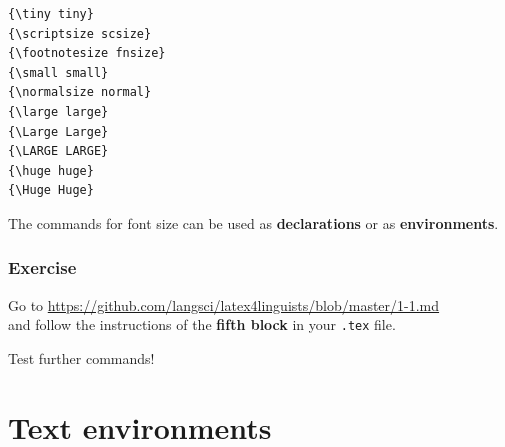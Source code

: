 \begin{frame}[fragile]


\begin{multicols}{2}
\begin{lstlisting}
{\tiny tiny} 
{\scriptsize scsize} 
{\footnotesize fnsize} 
{\small small} 
{\normalsize normal} 
{\large large} 
{\Large Large} 
{\LARGE LARGE} 
{\huge huge} 
{\Huge Huge} 
\end{lstlisting} 
\columnbreak{}
\end{multicols}

The commands for font size can be used as \textbf{declarations} or as \textbf{environments}.
\end{frame}


\begin{frame}[fragile]
\frametitle{Exercise}


Go to \url{https://github.com/langsci/latex4linguists/blob/master/1-1.md}\\
and follow the instructions of the \textbf{fifth block} in your \texttt{.tex} file.

\bigskip 

Test further commands!


\end{frame}


\section{Text environments}

